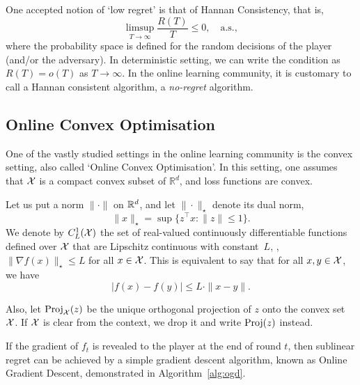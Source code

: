 One accepted notion of `low regret' is that of Hannan Consistency, that is, 
\[
    \limsup_{T\to\infty} \frac{R(T)}{T} \leq 0, \quad \text{a.s.},
\]
where the probability space is defined for the random decisions of the player (and/or the adversary). In deterministic setting, we can write the condition as $R(T) = o(T)$ as $T\to\infty$. In the online learning community, it is customary to call a Hannan consistent algorithm, a \emph{no-regret} algorithm.

\subsection{Online Convex Optimisation}
One of the vastly studied settings in the online learning community is the convex setting, also called `Online Convex Optimisation'. In this setting, one assumes that $\mathcal{X}$ is a compact convex subset of $\mathbb{R}^d$, and loss functions are convex. 

Let us put a norm $\|\cdot\|$ on $\mathbb{R}^d$, and let $\|\cdot\|_\star$ denote its dual norm, \ie
\[
    \|x\|_\star = \sup \{ z^\top x : \|z\| \leq 1 \}.
\]
We denote by $C^1_{L}(\mathcal{X})$ the set of real-valued continuously differentiable functions defined over $\mathcal{X}$ that are Lipschitz continuous with constant~$L$, \ie, $\|\nabla f(x)\|_\star \leq L$ for all $x\in \mathcal{X}$. This is equivalent to say that for all $x, y\in \mathcal{X}$, we have
\[
    |f(x) - f(y)| \leq L\cdot\|x-y\|.
\]


Also, let $\operatorname{Proj}_{\mathcal{X}}(z)$ be the unique orthogonal projection of $z$ onto the convex set $\mathcal{X}$. If $\mathcal{X}$ is clear from the context, we drop it and write $\operatorname{Proj}(z)$ instead.

If the gradient of $f_t$ is revealed to the player at the end of round $t$, then sublinear regret can be achieved by a simple gradient descent algorithm, known as Online Gradient Descent, demonstrated in Algorithm~\ref{alg:ogd}. 

